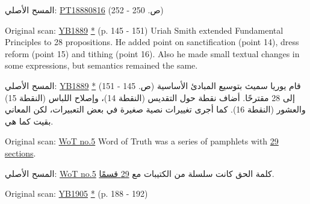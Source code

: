 المسح الأصلي: \href{https://adventistdigitallibrary.org/adl-402854/present-truth-august-16-1888?view_only=true&solr_nav%5Bid%5D=ff4d7f3f77b9bdf9e9ac&solr_nav%5Bpage%5D=0&solr_nav%5Boffset%5D=13}{PT18880816} (ص. 250 - 252)






Original scan: \href{https://documents.adventistarchives.org/Yearbooks/YB1889.pdf#search=Yearbook%201889}{YB1889} \href{https://forgotten-pillar.s3.us-east-2.amazonaws.com/YB1889.pdf}{*} (p. 145 - 151) Uriah Smith extended Fundamental Principles to 28 propositions. He added point on sanctification (point 14), dress reform (point 15) and tithing (point 16). Also he made small textual changes in some expressions, but semantics remained the same.


المسح الأصلي: \href{https://documents.adventistarchives.org/Yearbooks/YB1889.pdf#search=Yearbook%201889}{YB1889} \href{https://forgotten-pillar.s3.us-east-2.amazonaws.com/YB1889.pdf}{*} (ص. 145 - 151) قام يوريا سميث بتوسيع المبادئ الأساسية إلى 28 مقترحًا. أضاف نقطة حول التقديس (النقطة 14)، وإصلاح اللباس (النقطة 15) والعشور (النقطة 16). كما أجرى تغييرات نصية صغيرة في بعض التعبيرات، لكن المعاني بقيت كما هي.






Original scan: \href{https://adl.b2.adventistdigitallibrary.org/concern/published_works/4ffda25e-a06b-48d4-8ace-67cdcd33726f}{WoT no.5}
Word of Truth was a series of pamphlets with \href{https://adl.b2.adventistdigitallibrary.org/concern/parent/22267078_fundamental_principles_of_seventh_day_adventists/published_works/94a22141-33e8-4b9a-b397-2fe48c17bec4}{29 sections}.


المسح الأصلي: \href{https://adl.b2.adventistdigitallibrary.org/concern/published_works/4ffda25e-a06b-48d4-8ace-67cdcd33726f}{WoT no.5}
كلمة الحق كانت سلسلة من الكتيبات مع \href{https://adl.b2.adventistdigitallibrary.org/concern/parent/22267078_fundamental_principles_of_seventh_day_adventists/published_works/94a22141-33e8-4b9a-b397-2fe48c17bec4}{29 قسمًا}.






Original scan: \href{https://documents.adventistarchives.org/Yearbooks/YB1905.pdf#search=Yearbook%201905}{YB1905} \href{https://forgotten-pillar.s3.us-east-2.amazonaws.com/YB1905.pdf}{*} (p. 188 - 192)


